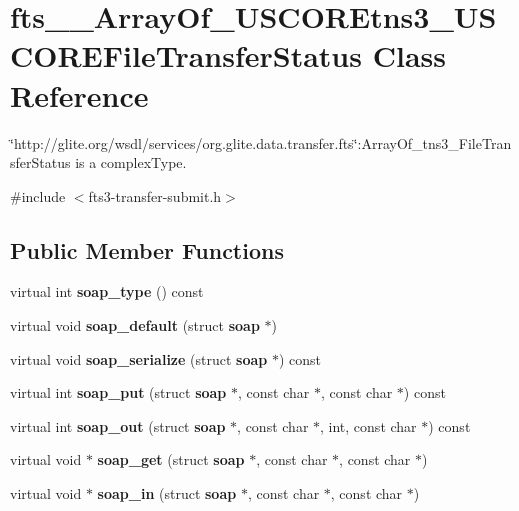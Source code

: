 \section{fts\_\-\_\-ArrayOf\_\-USCOREtns3\_\-USCOREFileTransferStatus Class Reference}
\label{classfts____ArrayOf__USCOREtns3__USCOREFileTransferStatus}


\char`\"{}http://glite.org/wsdl/services/org.glite.data.transfer.fts\char`\"{}:ArrayOf\_\-tns3\_\-FileTransferStatus is a complexType.  




{\ttfamily \#include $<$fts3-\/transfer-\/submit.h$>$}

\subsection*{Public Member Functions}
\begin{DoxyCompactItemize}
\item 
virtual int {\bfseries soap\_\-type} () const \label{classfts____ArrayOf__USCOREtns3__USCOREFileTransferStatus_a8422d50f9d366c8ef8f23b728d329a3e}

\item 
virtual void {\bfseries soap\_\-default} (struct {\bf soap} $\ast$)\label{classfts____ArrayOf__USCOREtns3__USCOREFileTransferStatus_a3fb957d5291c271d7392a19eb1c2efdd}

\item 
virtual void {\bfseries soap\_\-serialize} (struct {\bf soap} $\ast$) const \label{classfts____ArrayOf__USCOREtns3__USCOREFileTransferStatus_af30c81239cfcc66e3c16b2a0a2c44b55}

\item 
virtual int {\bfseries soap\_\-put} (struct {\bf soap} $\ast$, const char $\ast$, const char $\ast$) const \label{classfts____ArrayOf__USCOREtns3__USCOREFileTransferStatus_a6b5df0834d2ab20fa17bac2f71465e65}

\item 
virtual int {\bfseries soap\_\-out} (struct {\bf soap} $\ast$, const char $\ast$, int, const char $\ast$) const \label{classfts____ArrayOf__USCOREtns3__USCOREFileTransferStatus_a527cd818fb7e774c939399502abf47b2}

\item 
virtual void $\ast$ {\bfseries soap\_\-get} (struct {\bf soap} $\ast$, const char $\ast$, const char $\ast$)\label{classfts____ArrayOf__USCOREtns3__USCOREFileTransferStatus_a1351affd5206b64f4cca39fdcb1e35c7}

\item 
virtual void $\ast$ {\bfseries soap\_\-in} (struct {\bf soap} $\ast$, const char $\ast$, const char $\ast$)\label{classfts____ArrayOf__USCOREtns3__USCOREFileTransferStatus_acb9621c40812ea49cb23d9e20b5ba1e8}

\end{DoxyCompactItemize}
